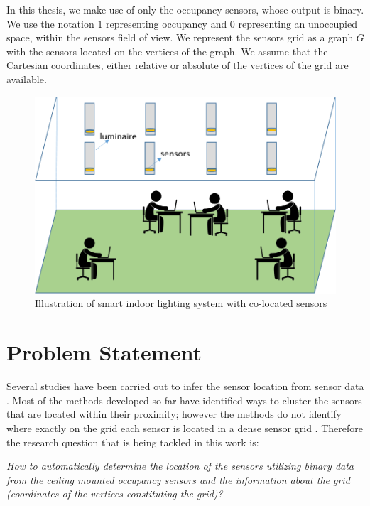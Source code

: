 In this thesis, we make use of only the occupancy sensors, whose output is binary. 
We use the notation $1$ representing occupancy and $0$ representing an unoccupied space, within the sensors field of view. 
We represent the sensors grid as a graph $G$ with the sensors located on the vertices of the graph. We assume that the Cartesian coordinates, either relative or absolute of the vertices of the grid are available. 

\begin{figure}[!ht]
\includegraphics[scale=0.75]{./pics/systemDescription.png}
\caption{Illustration of smart indoor lighting system with co-located sensors}
\label{fig:sysDes}
\centering
\end{figure}

\section{Problem Statement}

Several studies  have been carried out to infer the sensor location from sensor data \cite{Hong:2013:TAS:2528282.2528302,doi:10.1061/9780784413616.226,Koc:2014:CLC:2674061.2674075,Lu:2014:SBS:2648771.2629441,ellis2012creating,muller2014automated,marinakis2005learning}. Most of the methods developed so far have identified ways to cluster the sensors that are located within their proximity; however the methods do not identify where exactly on the grid each sensor is located in a dense sensor grid \cite{Hong:2013:TAS:2528282.2528302,doi:10.1061/9780784413616.226,Koc:2014:CLC:2674061.2674075}.  Therefore the research question that is being tackled in this work is:

\textit{How to automatically determine the location of the sensors utilizing binary data from the ceiling mounted occupancy sensors and the information about the grid (coordinates of the vertices constituting the grid)?}\\



